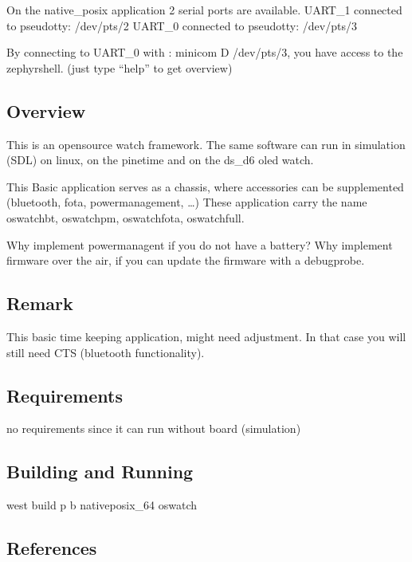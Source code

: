\documentclass[letterpaper,10pt,english]{sphinxmanual}
\begin{document}
On the native\_posix application 2 serial ports are available.
UART\_1 connected to pseudotty: /dev/pts/2
UART\_0 connected to pseudotty: /dev/pts/3

By connecting to UART\_0 with :  minicom \sphinxhyphen{}D /dev/pts/3, you have access to the zephyr\sphinxhyphen{}shell.
(just type “help” to get overview)


\subsection{Overview}
\label{\detokenize{samples/oswatchREADME:overview}}
This is an opensource watch framework.
The same software can run in simulation (SDL) on linux, on the pinetime and on the ds\_d6 oled watch.

This Basic application serves as a chassis, where accessories can be supplemented (bluetooth, fota, powermanagement, …)
These application carry the name oswatch\sphinxhyphen{}bt, oswatch\sphinxhyphen{}pm, oswatch\sphinxhyphen{}fota, oswatch\sphinxhyphen{}full.

Why implement powermanagent if you do not have a battery?
Why implement firmware over the air, if you can update the firmware with a debugprobe.


\subsection{Remark}
\label{\detokenize{samples/oswatchREADME:remark}}
This basic time keeping application, might need adjustment.
In that case you will still need CTS (bluetooth functionality).


\subsection{Requirements}
\label{\detokenize{samples/oswatchREADME:requirements}}
no requirements since it can run without board (simulation)


\subsection{Building and Running}
\label{\detokenize{samples/oswatchREADME:building-and-running}}
west build \sphinxhyphen{}p \sphinxhyphen{}b  native\sphinxhyphen{}posix\_64 oswatch


\subsection{References}
\label{\detokenize{samples/oswatchREADME:references}}
\end{document}
